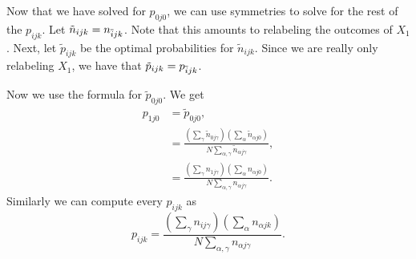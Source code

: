 Now that we have solved for \(p_{0j0}\), we can use symmetries to solve for the rest of the \(p_{ijk}\). Let
\(\tilde n_{ijk} = n_{\overline{i}jk} \). Note that this amounts to relabeling the outcomes of \(X_1\). 
Next, let \(\tilde p_{ijk}\) be the optimal probabilities for \(\tilde n_{ijk}\). Since we are really
only relabeling \(X_1\), we have that \(\tilde p_{ijk} = p_{\overline{i}jk}\). 

Now we use the formula for \(\tilde p_{0j0}\). We get
\begin{align}
p_{1j0} & = \tilde p_{0j0}, \\
& = \frac{\left(\sum_\gamma \tilde n_{0j\gamma}\right) 
        \left(\sum_\alpha \tilde n_{\alpha j0}\right) }
        {N \sum_{\alpha, \gamma} \tilde n_{\alpha j\gamma}}, \\
& = \frac{\left(\sum_\gamma n_{1j\gamma}\right) 
        \left(\sum_\alpha n_{\alpha j0}\right) }
        {N \sum_{\alpha, \gamma} n_{\alpha j\gamma}}.
\end{align} 
Similarly we can compute every \(p_{ijk}\) as
\begin{equation}
p_{ijk} = \frac{\left(\sum_\gamma n_{ij\gamma}\right)
                \left(\sum_\alpha n_{\alpha jk}\right) }
               {N \sum_{\alpha, \gamma} n_{\alpha j\gamma}}.
\end{equation}
